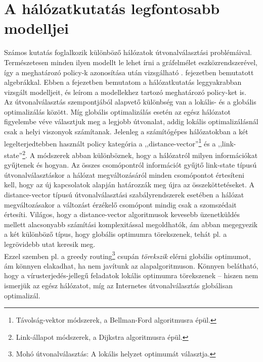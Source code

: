 \setcounter{note}{0}

\chapter{A hálózatkutatás legfontosabb modelljei}\label{examples}
Számos kutatás foglalkozik különböző hálózatok útvonalválasztási problémáival. Természetesen minden ilyen modellt le lehet írni a gráfelmélet eszközrendszerével, így a meghatározó policy-k azonosítása után vizsgálható . fejezetben bemutatott algebrákkal. Ebben a fejezetben bemutatom a hálózatkutatás leggyakrabban vizsgált modelljeit, és leírom a modellekhez tartozó meghatározó policy-ket is.\\

Az útvonalválasztás szempontjából alapvető különbség van a lokális- és a globális optimalizálás között. Míg globális optimalizálás esetén az egész hálózatot figyelembe véve választjuk meg a legjobb útvonalat, addig lokális optimalizálásnál csak a helyi viszonyok számítanak. Jelenleg a számítógépes hálózatokban a két legelterjedtebben használt policy kategória a ,,distance-vector''\footnote{Távolság-vektor módszerek, a Bellman-Ford algoritmusra épül.} és a ,,link-state''\footnote{Link-állapot módszerek, a Dijkstra algoritmusra épül.}. A módszerek abban különböznek, hogy a hálózatról milyen információkat gyűjtenek és hogyan. Az összes csomópontról információt gyűjtő link-state típusú útvonalválasztáskor a hálózat megváltozásáról minden csomópontot értesíteni kell, hogy az új kapcsolatok alapján határozzák meg újra az összeköttetéseket. A distance-vector típusú útvonalválasztási szabályrendszerek esetében a hálózat megváltozásakor a változást érzékelő csomópont mindig csak a szomszédait értesíti. Világos, hogy a distance-vector algoritmusok kevesebb üzenetküldés mellett alacsonyabb számítási komplexitással megoldhatók, ám abban megegyezik a két különböző típus, hogy globális optimumra törekszenek, tehát pl. a legrövidebb utat keresik meg.\\
Ezzel szemben pl. a greedy routing\footnote{Mohó útvonalválasztás: A lokális helyzet optimumát választja.} csupán \textit{törekszik} elérni globális optimumot, ám könnyen elakadhat, ha nem javítunk az alapalgoritmuson\cite{Routing_with_Guaranteed_Delivery_in_Adhoc_Wireless_Networks}. Könnyen belátható, hogy a vírusterjedés-jellegű feladatok lokális optimumra törekszenek -- hiszen nem ismerjük az egész hálózatot, míg az Internetes útvonalválasztás globálisan optimalizál.\\

